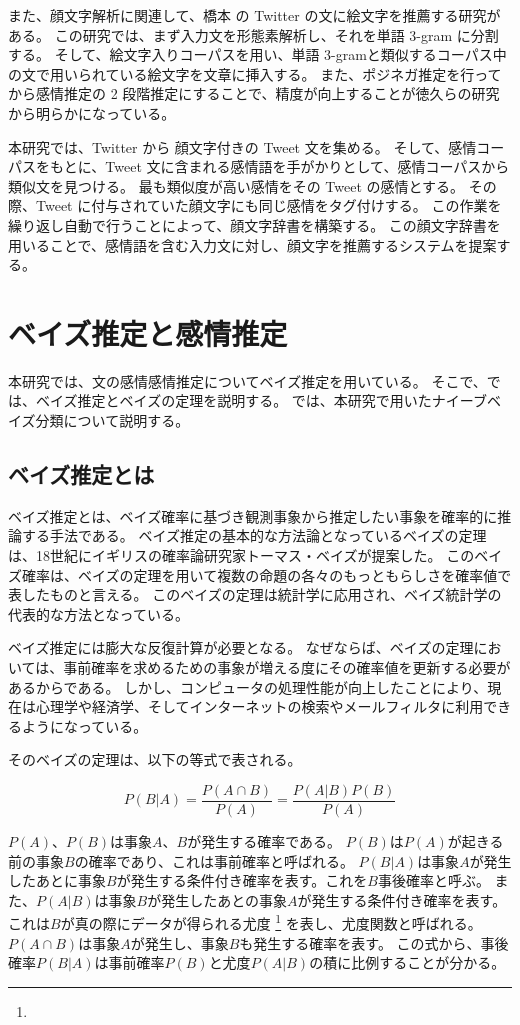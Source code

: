 \documentclass[11pt,a4j]{jsarticle}
\begin{document}
また、顔文字解析に関連して、橋本  の Twitter の文に絵文字を推薦する研究がある。
この研究では、まず入力文を形態素解析し、それを単語 3-gram に分割する。
そして、絵文字入りコーパスを用い、単語 3-gramと類似するコーパス中の文で用いられている絵文字を文章に挿入する。
また、ポジネガ推定を行ってから感情推定の 2 段階推定にすることで、精度が向上することが徳久らの研究 から明らかになっている。

本研究では、Twitter から 顔文字付きの Tweet 文を集める。
そして、感情コーパスをもとに、Tweet 文に含まれる感情語を手がかりとして、感情コーパスから類似文を見つける。
最も類似度が高い感情をその Tweet の感情とする。
その際、Tweet に付与されていた顔文字にも同じ感情をタグ付けする。
この作業を繰り返し自動で行うことによって、顔文字辞書を構築する。
この顔文字辞書を用いることで、感情語を含む入力文に対し、顔文字を推薦するシステムを提案する。

\section{ベイズ推定と感情推定}\label{sec:def}
本研究では、文の感情感情推定についてベイズ推定を用いている。
そこで、では、ベイズ推定とベイズの定理を説明する。
では、本研究で用いたナイーブベイズ分類について説明する。

  \subsection{ベイズ推定とは}\label{sec:defbayes}
ベイズ推定とは、ベイズ確率に基づき観測事象から推定したい事象を確率的に推論する手法である。
ベイズ推定の基本的な方法論となっているベイズの定理は、18世紀にイギリスの確率論研究家トーマス・ベイズが提案した。
このベイズ確率は、ベイズの定理を用いて複数の命題の各々のもっともらしさを確率値で表したものと言える。
このベイズの定理は統計学に応用され、ベイズ統計学の代表的な方法となっている。


ベイズ推定には膨大な反復計算が必要となる。
なぜならば、ベイズの定理においては、事前確率を求めるための事象が増える度にその確率値を更新する必要があるからである。
しかし、コンピュータの処理性能が向上したことにより、現在は心理学や経済学、そしてインターネットの検索やメールフィルタに利用できるようになっている。

そのベイズの定理は、以下の等式で表される。

\[
P(B|A)=\frac{P(A \cap B)}{P(A)}=\frac{P(A|B)P(B)}{P(A)}
\]


$P(A)$、$P(B)$は事象$A$、$B$が発生する確率である。
$P(B)$は$P(A)$が起きる前の事象$B$の確率であり、これは事前確率と呼ばれる。
$P(B|A)$は事象$A$が発生したあとに事象$B$が発生する条件付き確率を表す。これを$B$事後確率と呼ぶ。
また、$P(A|B)$は事象$B$が発生したあとの事象$A$が発生する条件付き確率を表す。
これは$B$が真の際にデータが得られる尤度 \footnote{} を表し、尤度関数と呼ばれる。
$P(A \cap B)$は事象$A$が発生し、事象$B$も発生する確率を表す。
この式から、事後確率$P(B|A)$は事前確率$P(B)$と尤度$P(A|B)$の積に比例することが分かる。
\end{document}
